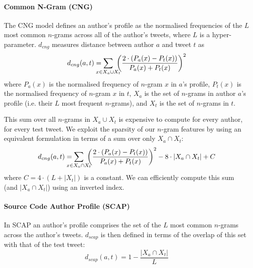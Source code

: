 \documentclass[twocolumn,10pt]{article}
\begin{document}
\paragraph{Common N-Gram (CNG)}
The CNG model\supercite{kevselj2003n} defines an author's profile
as the normalised frequencies of the $L$ most common $n$-grams
across all of the author's tweets, where $L$ is a hyper-parameter.
$d_{cng}$ measures distance between author $a$ and tweet $t$ as
$$
d_{cng}(a, t) =
    \smashoperator{\sum_{x \in X_a \cup X_t}}\ 
        {\left ( \frac{2 \cdot (P_a(x) - P_t(x))}{P_a(x) + P_t(x)} \right )}^2
$$
where $P_a(x)$ is the normalised frequency of $n$-gram $x$ in
$a$'s profile, $P_t(x)$ is the normalised frequency of $n$-gram
$x$ in $t$, $X_a$ is the set of $n$-grams in author $a$'s profile
(i.e. their $L$ most frequent $n$-grams), and $X_t$ is the set
of $n$-grams in $t$.

This sum over all $n$-grams in $X_a \cup X_t$ is expensive
to compute for every author, for every test tweet.
We exploit the sparsity of our $n$-gram features by using
an equivalent formulation in terms of a sum over only
$X_a \cap X_t$:
$$
d_{cng} (a, t) =
    \smashoperator{\sum_{x \in X_a \cap X_t}}\ 
        {\left ( \frac{2 \cdot (P_a(x) - P_t(x))}{P_a(x) + P_t(x)} \right )}^2
        - 8 \cdot |X_a \cap X_t| + C
$$
where $C=4 \cdot (L + |X_t|)$ is a constant.
We can efficiently compute this sum (and $|X_a \cap X_t|$)
using an inverted index.


\paragraph{Source Code Author Profile (SCAP)} In SCAP\supercite{frantzeskou2006effective}
an author's profile comprises the set of the $L$ most common
$n$-grams across the author's tweets. $d_{scap}$ is then defined in
terms of the overlap of this set with that of the test tweet:
$$
d_{scap}(a, t) = 1 - \frac{|X_a \cap X_t|}{L} %
$$
\end{document}
